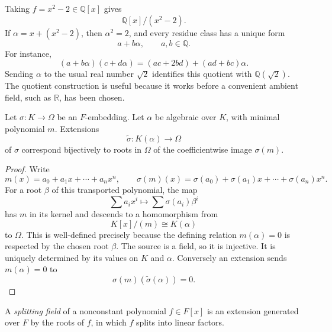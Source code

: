 \begin{example}
Taking \(f=x^2-2\in\mathbb Q[x]\) gives
\[
\mathbb Q[x]/(x^2-2).
\]
If \(\alpha=x+(x^2-2)\), then \(\alpha^2=2\), and every residue class has
a unique form
\[
a+b\alpha,
\qquad a,b\in\mathbb Q.
\]
For instance,
\[
(a+b\alpha)(c+d\alpha)=(ac+2bd)+(ad+bc)\alpha.
\]
Sending \(\alpha\) to the usual real number \(\sqrt2\) identifies this
quotient with \(\mathbb Q(\sqrt2)\).  The quotient construction is useful
because it works before a convenient ambient field, such as \(\mathbb R\),
has been chosen.
\end{example}

\begin{lemma}\label{lem:root-extension}
Let \(\sigma:K\to\Omega\) be an \(F\)-embedding.  Let \(\alpha\) be
algebraic over \(K\), with minimal polynomial \(m\).  Extensions
\[
\widetilde\sigma:K(\alpha)\longrightarrow\Omega
\]
of \(\sigma\) correspond bijectively to roots in \(\Omega\) of the
coefficientwise image \(\sigma(m)\).
\end{lemma}
\begin{proof}
Write
\[
m(x)=a_0+a_1x+\cdots+a_nx^n,
\qquad
\sigma(m)(x)=\sigma(a_0)+\sigma(a_1)x+\cdots+\sigma(a_n)x^n.
\]
For a root \(\beta\) of this transported polynomial, the map
\[
\sum a_ix^i\longmapsto\sum\sigma(a_i)\beta^i
\]
has \(m\) in its kernel and descends to a homomorphism from
\[
K[x]/(m)\cong K(\alpha)
\]
to \(\Omega\).  This is well-defined precisely because the defining relation
\(m(\alpha)=0\) is respected by the chosen root \(\beta\).  The source is a
field, so it is injective.  It is uniquely determined by its values on \(K\)
and \(\alpha\).  Conversely an extension
sends \(m(\alpha)=0\) to
\[
\sigma(m)(\widetilde\sigma(\alpha))=0.
\]
\end{proof}

\begin{definition}
A \emph{splitting field} of a nonconstant polynomial \(f\in F[x]\) is an
extension generated over \(F\) by the roots of \(f\), in which \(f\) splits
into linear factors.
\end{definition}

